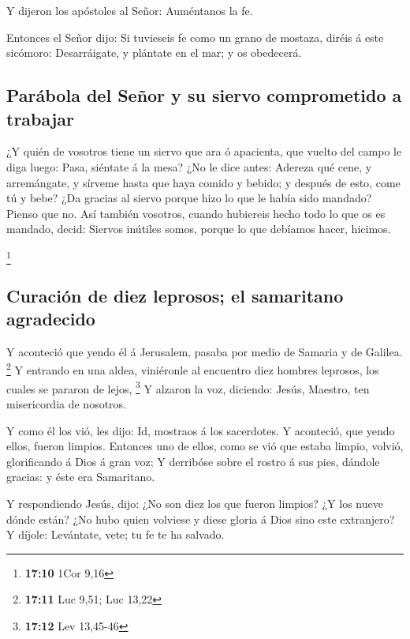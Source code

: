  Y dijeron los apóstoles al Señor: Auméntanos la fe.

 Entonces el Señor dijo: Si tuvieseis fe como un grano de
mostaza, diréis á este sicómoro: Desarráigate, y plántate en el mar; y
os obedecerá.

\hypertarget{paruxe1bola-del-seuxf1or-y-su-siervo-comprometido-a-trabajar}{%
\subsection{Parábola del Señor y su siervo comprometido a
trabajar}\label{paruxe1bola-del-seuxf1or-y-su-siervo-comprometido-a-trabajar}}

 ¿Y quién de vosotros tiene un siervo que ara ó apacienta,
que vuelto del campo le diga luego: Pasa, siéntate á la mesa?
 ¿No le dice antes: Adereza qué cene, y arremángate, y
sírveme hasta que haya comido y bebido; y después de esto, come tú y
bebe?  ¿Da gracias al siervo porque hizo lo que le había
sido mandado? Pienso que no.  Así también vosotros,
cuando hubiereis hecho todo lo que os es mandado, decid: Siervos
inútiles somos, porque lo que debíamos hacer, hicimos.

\footnote{\textbf{17:10} 1Cor 9,16}

\hypertarget{curaciuxf3n-de-diez-leprosos-el-samaritano-agradecido}{%
\subsection{Curación de diez leprosos; el samaritano
agradecido}\label{curaciuxf3n-de-diez-leprosos-el-samaritano-agradecido}}

 Y aconteció que yendo él á Jerusalem, pasaba por medio
de Samaria y de Galilea. \footnote{\textbf{17:11} Luc 9,51; Luc 13,22}
 Y entrando en una aldea, viniéronle al encuentro diez
hombres leprosos, los cuales se pararon de lejos, \footnote{\textbf{17:12}
  Lev 13,45-46}  Y alzaron la voz, diciendo: Jesús,
Maestro, ten misericordia de nosotros.

 Y como él los vió, les dijo: Id, mostraos á los
sacerdotes. Y aconteció, que yendo ellos, fueron limpios.
 Entonces uno de ellos, como se vió que estaba limpio,
volvió, glorificando á Dios á gran voz;  Y derribóse
sobre el rostro á sus pies, dándole gracias: y éste era Samaritano.

 Y respondiendo Jesús, dijo: ¿No son diez los que fueron
limpios? ¿Y los nueve dónde están?  ¿No hubo quien
volviese y diese gloria á Dios sino este extranjero?  Y
díjole: Levántate, vete; tu fe te ha salvado.

